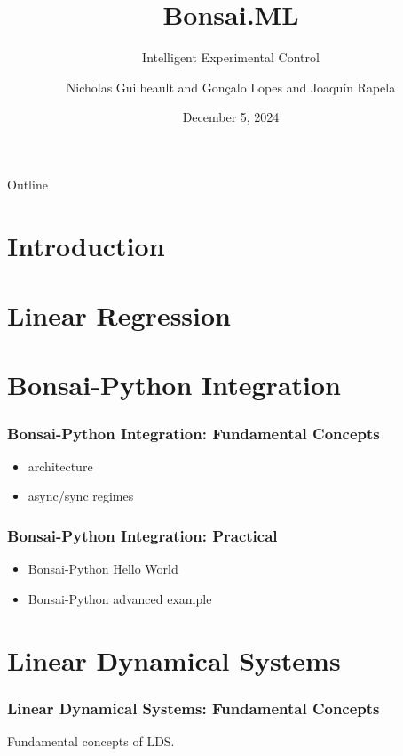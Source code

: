 \documentclass{beamer}
\title{Bonsai.ML}
\subtitle{Intelligent Experimental Control}
\author{Nicholas Guilbeault and Gon\c{c}alo Lopes and Joaqu\'{i}n Rapela}
\institute{Gatsby Computational Neuroscience Unit\\NeuroGEARS Ltd.}
\date{December 5, 2024}
\begin{document}
\begin{frame}
	\titlepage
\end{frame}

\begin{frame}{Outline}
    \tableofcontents
\end{frame}

\section{Introduction}



\section{Linear Regression}



\section{Bonsai-Python Integration}

\begin{frame}
    \frametitle{Bonsai-Python Integration: Fundamental Concepts}

    \begin{itemize}
        \item architecture
        \item async/sync regimes
    \end{itemize}

\end{frame}

\begin{frame}
    \frametitle{Bonsai-Python Integration: Practical}

    \begin{itemize}
        \item Bonsai-Python Hello World
        \item Bonsai-Python advanced example
    \end{itemize}

\end{frame}

\section{Linear Dynamical Systems}

\begin{frame}
    \frametitle{Linear Dynamical Systems: Fundamental Concepts}

    Fundamental concepts of LDS.

\end{frame}
\end{document}
